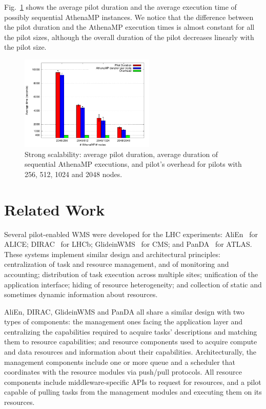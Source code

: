 \documentclass[conference]{IEEEtran}
\begin{document}
Fig.~\ref{fig:strongScala}  shows the average pilot duration and the average
execution time of possibly sequential AthenaMP instances.  We  notice that the
difference between the pilot duration and the AthenaMP execution times is almost
constant for all the pilot sizes, although the overall duration of the pilot
decreases linearly with the pilot size.

\begin{figure}[!t]
        \includegraphics[height=4.5cm,width=\columnwidth]{strong.pdf}
    \caption{Strong scalability:  average pilot duration, average duration of
    sequential AthenaMP executions, and pilot's overhead for pilots with 256, 512, 1024 and 2048 nodes.}
\label{fig:strongScala}
\end{figure}


\section{Related Work}
\label{sec:related}

Several pilot-enabled WMS were developed for the LHC experiments:
AliEn~\cite{Bagnasco2010} for ALICE; DIRAC~\cite{Paterson2010} for LHCb;
GlideinWMS~\cite{sfiligoi2008glideinwms} for CMS; and
PanDA~\cite{maeno2014evolution} for ATLAS. These systems implement similar
design and architectural principles: centralization of task and resource
management, and of monitoring and accounting; distribution of task execution
across multiple sites; unification of the application interface; hiding of
resource heterogeneity; and collection of static and sometimes dynamic
information about resources.

AliEn, DIRAC, GlideinWMS and PanDA all share a similar design with two types of
components: the management ones facing the application layer and centralizing
the capabilities required to acquire tasks' descriptions and matching them to
resource capabilities; and resource components used to acquire compute and data
resources and information about their capabilities. Architecturally, the
management components include one or more queue and a scheduler that coordinates
with the resource modules via push/pull protocols. All resource components
include middleware-specific APIs to request for resources, and a pilot capable
of pulling tasks from the management modules and executing them on its
resources.
\end{document}
